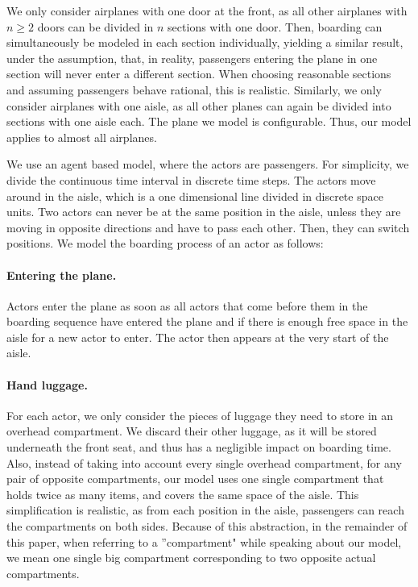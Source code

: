 \documentclass[11pt]{article}
\begin{document}
We only consider airplanes with one door at the front, as all other airplanes with $n \geq 2$ doors can be divided in $n$ sections with one door. Then, boarding can simultaneously be modeled in each section individually, yielding a similar result, under the assumption, that, in reality, passengers entering the plane in one section will never enter a different section.
When choosing reasonable sections and assuming passengers behave rational, this is realistic. Similarly, we only consider airplanes with one aisle, as all other planes can again be divided into sections with one aisle each. The plane we model is configurable. Thus, our model applies to almost all airplanes.

We use an agent based model, where the actors are passengers. For simplicity, we divide the continuous time interval in discrete time steps. The actors move around in the aisle, which is a one dimensional line divided in discrete space units. Two actors can never be at the same position in the aisle, unless they are moving in opposite directions and have to pass each other. Then, they can switch positions. We model the boarding process of an actor as follows:

\paragraph{Entering the plane.}
Actors enter the plane as soon as all actors that come before them in the boarding sequence have entered the plane and if there is enough free space in the aisle for a new actor to enter. The actor then appears at the very start of the aisle.


\paragraph{Hand luggage.}
For each actor, we only consider the pieces of luggage they need to store in an overhead compartment. We discard their other luggage, as it will be stored underneath the front seat, and thus has a negligible impact on boarding time. Also, instead of taking into account every single overhead compartment, for any pair of opposite compartments, our model uses one single compartment that holds twice as many items, and covers the same space of the aisle. This simplification is realistic, as from each position in the aisle, passengers can reach the compartments on both sides. Because of this abstraction, in the remainder of this paper, when referring to a ''compartment" while speaking about our model, we mean one single big compartment corresponding to two opposite actual compartments.
\end{document}
